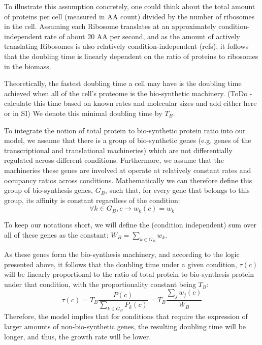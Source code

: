 \documentclass[notitlepage]{article}
\begin{document}
To illustrate this assumption concretely, one could think about the total amount of proteins per cell (measured in AA count) divided by the number of ribosomes in the cell.
Assuming each Ribosome translates at an approximately condition-independent rate of about 20 AA per second, and as the amount of actively translating Ribosomes is also relatively condition-independent (refs), it follows that the doubling time is linearly dependent on the ratio of proteins to ribosomes in the biomass.

Theoretically, the fastest doubling time a cell may have is the doubling time achieved when all of the cell's proteome is the bio-synthetic machinery.
(ToDo - calculate this time based on known rates and molecular sizes and add either here or in SI)
We denote this minimal doubling time by $T_B$.

To integrate the notion of total protein to bio-synthetic protein ratio into our model, we assume that there is a group of bio-synthetic genes (e.g. genes of the transcriptional and translational machineries) which are not differentially regulated across different conditions.
Furthermore, we assume that the machineries these genes are involved at operate at relatively constant rates and occupancy ratios across conditions.
Mathematically we can therefore define this group of bio-synthesis genes, $G_B$, such that, for every gene that belongs to this group, its affinity is constant regardless of the condition:
\begin{equation}
  \label{eq:biosynth-def}
  \forall k \in G_B, c \rightarrow w_k(c)=w_k
\end{equation}

To keep our notations short, we will define the (condition independent) sum over all of these genes as the constant: $W_B = \sum_{k\in G_B}w_k$.

As these genes form the bio-synthesis machinery, and according to the logic presented above, it follows that the doubling time under a given condition, $\tau(c)$ will be linearly proportional to the ratio of total protein to bio-synthesis protein under that condition, with the proportionality constant being $T_B$:
\begin{equation}
  \label{eq:gr-ratio}
  \tau(c) = T_B\frac{P(c)}{\sum_{k\in G_B}P_k(c)}=T_B\frac{\sum_jw_j(c)}{W_B}
\end{equation}
Therefore, the model implies that for conditions that require the expression of larger amounts of non-bio-synthetic genes, the resulting doubling time will be longer, and thus, the growth rate will be lower.
\end{document}
